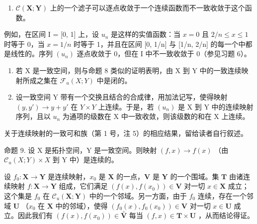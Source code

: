 \begin{enumerate}
\def\labelenumi{\arabic{enumi})}
\setcounter{enumi}{1}
\tightlist
\item
  \(\mathcal{C}(\mathbf{X};\mathbf{Y})\) 上的一个滤子可以逐点收敛于一个连续函数而不一致收敛于这个函数。
\end{enumerate}

例如，在区间 I = {[}0, 1{]} 上，设 \(u_n\) 是这样的实值函数：当 \(x = 0\) 且 \(2/n \leqslant x \leqslant 1\) 时等于 0，当 \(x = 1/n\) 时等于 1，并且在区间 {[}0, 1/n{]} 与 {[}1/n, 2/n{]} 的每一个中都是线性的。序列 \((u_n)\) 逐点收敛于 0，但在 I 中不一致收敛于 0（参见习题 6）。

\begin{enumerate}
\def\labelenumi{\arabic{enumi})}
\setcounter{enumi}{2}
\item
  若 X 是一致空间，则与命题 8 类似的证明表明，由 X 到 Y 中的一致连续映射所成之集在 \(\mathcal{F}_u(X;Y)\) 中是闭的。
\item
  设一致空间 Y 带有一个交换且结合的合成律，用加法记写，使得映射 \((y, y') \to y + y'\) 在 \(Y \times Y\) 上连续。于是，若 \((u_n)\) 是 X 到 Y 中的连续映射序列，且以 \(u_n\) 为通项的级数在 X 中一致收敛，则该级数的和在 X 上连续。
\end{enumerate}

关于连续映射的一致可和族（第 1 号，注 5）的相应结果，留给读者自行叙述。

命题 9. 设 X 是拓扑空间，Y 是一致空间。则映射 \((f, x) \to f(x)\) （由 \(\mathcal{C}_u(X; Y) \times X\) 到 Y 中）是连续的。

设 \(f_0: \mathbf{X} \to \mathbf{Y}\) 是连续映射，\(x_0\) 是 \(\mathbf{X}\) 的一点，\(\mathbf{V}\) 是 \(\mathbf{Y}\) 的一个围域。集 \(\mathbf{T}\) 由诸连续映射 \(f: \mathbf{X} \to \mathbf{Y}\) 组成，它们满足 \((f(x), f(x_0)) \in \mathbf{V}\) 对一切 \(x \in \mathbf{X}\) 成立；这个集是 \(f_0\) 在 \(\mathcal{C}_u(\mathbf{X}; \mathbf{Y})\) 中的一个邻域。另一方面，由于 \(f_0\) 连续，存在一个邻域 \(\mathbf{U}\) （\(x_0\) 在 \(\mathbf{X}\) 中的邻域），使得 \((f_0(x), f_0(x_0)) \in \mathbf{V}\) 对一切 \(x \in \mathbf{U}\) 成立。因此我们有 \((f(x), f(x_0)) \in \overset{\circ}{\mathbf{V}}\) 每当 \((f, x) \in \mathbf{T} \times \mathbf{U}\) ，从而结论得证。

